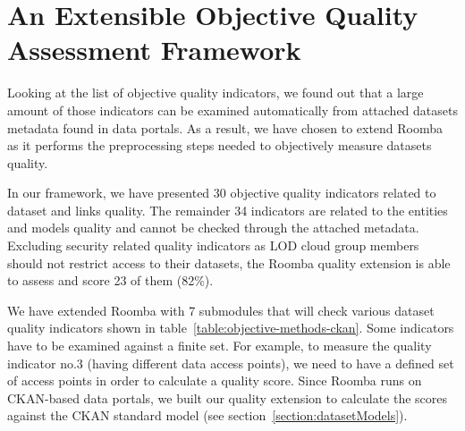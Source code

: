 
\section{An Extensible Objective Quality Assessment Framework}
\label{section:quality-assessment-framework}

Looking at the list of objective quality indicators, we found out that a large amount of those indicators can be examined automatically from attached datasets metadata found in data portals. As a result, we have chosen to extend Roomba as it performs the preprocessing steps needed to objectively measure datasets quality.

In our framework, we have presented 30 objective quality indicators related to dataset and links quality. The remainder 34 indicators are related to the entities and models quality and cannot be checked through the attached metadata. Excluding security related quality indicators as LOD cloud group members should not restrict access to their datasets, the Roomba quality extension is able to assess and score 23 of them (82\%).

We have extended Roomba with 7 submodules that will check various dataset quality indicators shown in table~\ref{table:objective-methods-ckan}. Some indicators have to be examined against a finite set. For example, to measure the quality indicator no.3 (having different data access points), we need to have a defined set of access points in order to calculate a quality score. Since Roomba runs on CKAN-based data portals, we built our quality extension to calculate the scores against the CKAN standard model (see section~\ref{section:datasetModels}).

